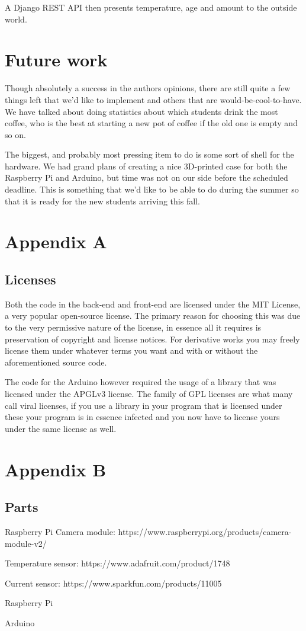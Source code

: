 \documentclass[12pt,a4paper,oneside,article]{memoir}
\numberwithin{equation}{chapter}
\begin{document}
A Django REST API then presents temperature, age and amount to the outside 
world. 

\section{Future work}\label{sec:future-work}
Though absolutely a success in the authors opinions, there are still quite a few
things left that we'd like to implement and others that are
would-be-cool-to-have. We have talked about doing statistics about which
students drink the most coffee, who is the best at starting a new pot of coffee
if the old one is empty and so on.

The biggest, and probably most pressing item to do is some sort of shell for the
hardware. We had grand plans of creating a nice 3D-printed case for both the
Raspberry Pi and Arduino, but time was not on our side before the scheduled
deadline. This is something that we'd like to be able to do during the summer so
that it is ready for the new students arriving this fall.

\clearpage %
\section{Appendix A}\label{sec:appendixA}
\subsection{Licenses}\label{sec:licenses}
Both the code in the back-end and front-end are licensed under the MIT License,
a very popular open-source license. The primary reason for choosing this was due
to the very permissive nature of the license, in essence all it requires is
preservation of copyright and license notices. For derivative works you may
freely license them under whatever terms you want and with or without the
aforementioned source code.

The code for the Arduino however required the usage of a library that was
licensed under the APGLv3 license. The family of GPL licenses are what many call
viral licenses, if you use a library in your program that is licensed under
these your program is in essence infected and you now have to license yours
under the same license as well.


\section{Appendix B}\label{sec:appendixB}
\subsection{Parts}\label{sec:sensors}
Raspberry Pi Camera module: 
https://www.raspberrypi.org/products/camera-module-v2/

Temperature sensor: https://www.adafruit.com/product/1748

Current sensor: https://www.sparkfun.com/products/11005

Raspberry Pi

Arduino

\clearpage{}
\renewcommand*{\UrlFont}{\footnotesize\ttfamily}
\printbibliography{}
\end{document}
